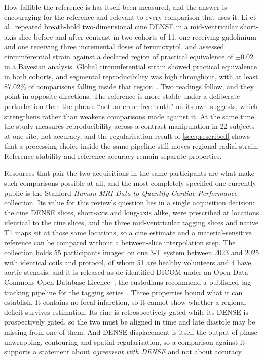 How fallible the reference is has itself been measured, and the answer is encouraging for the
reference and relevant to every comparison that uses it. Li et al.\ repeated breath-hold
two-dimensional cine DENSE in a mid-ventricular short-axis slice before and after contrast in two
cohorts of 11, one receiving gadolinium and one receiving three incremental doses of ferumoxytol,
and assessed circumferential strain against a declared region of practical equivalence of $\pm0.02$
in a Bayesian analysis. Global circumferential strain showed practical equivalence in both cohorts,
and segmental reproducibility was high throughout, with at least 87.02\% of comparisons falling
inside that region~\citep{li2025densereprod}. Two readings follow, and they point in opposite
directions. The reference is more stable under a deliberate perturbation than the phrase
\enquote{not an error-free truth} on its own suggests, which strengthens rather than weakens
comparisons made against it. At the same time the study measures reproducibility across a contrast
manipulation in 22 subjects at one site, not accuracy, and the regularisation result of
\cref{sec:prescribed} shows that a processing choice inside the same pipeline still moves regional
radial strain. Reference stability and reference accuracy remain separate properties.

Resources that pair the two acquisitions in the same participants are what make such comparisons
possible at all, and the most completely specified one currently public is the Stanford
\emph{Human MRI Data to Quantify Cardiac Performance} collection. Its value for this review's
question lies in a single acquisition decision: the cine DENSE slices, short-axis and long-axis
alike, were prescribed at locations identical to the cine slices, and the three mid-ventricular
tagging slices and native T1 maps sit at those same locations, so a cine estimate and a
material-sensitive reference can be compared without a between-slice interpolation step. The
collection holds 55 participants imaged on one 3-T system between 2023 and 2025 with identical coils
and protocol, of whom 51 are healthy volunteers and 4 have aortic stenosis, and it is released as
de-identified DICOM under an Open Data Commons Open Database Licence~\citep{stanforddata}; the
custodians recommend a published tag-tracking pipeline for the tagging
series~\citep{loecher2021tagging}. Three properties bound what it can establish. It contains no
focal infarction, so it cannot show whether a regional deficit survives estimation. Its cine is
retrospectively gated while its DENSE is prospectively gated, so the two must be aligned in time and
late diastole may be missing from one of them. And DENSE displacement is itself the output of phase
unwrapping, contouring and spatial regularisation, so a comparison against it supports a statement
about \emph{agreement with DENSE} and not about accuracy.

